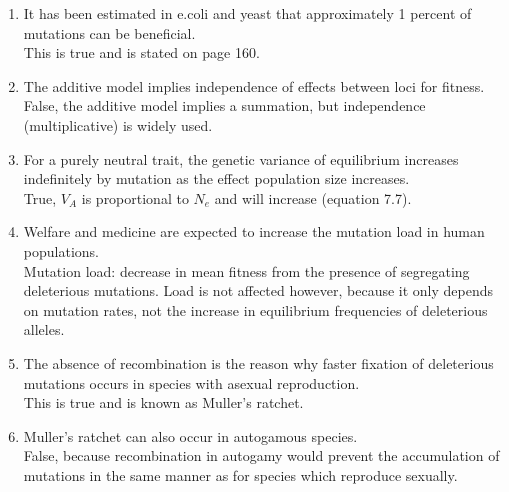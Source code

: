 \documentclass[12pt]{amsart}
\begin{document}
\begin{enumerate}
\item It has been estimated in e.coli and yeast that approximately 1 percent of mutations can be beneficial.\\
This is true and is stated on page 160. \\
\item The additive model implies independence of effects between loci for fitness.\\
False, the additive model implies a summation, but independence (multiplicative) is widely used. \\
\item For a purely neutral trait, the genetic variance of equilibrium increases indefinitely by mutation as the effect population size increases.\\
True, $V_A$ is proportional to $N_e$ and will increase (equation 7.7).\\
\item Welfare and medicine are expected to increase the mutation load in human populations.\\
Mutation load: decrease in mean fitness from the presence of segregating deleterious mutations. Load is not affected however, because it only depends on mutation rates, not the increase in equilibrium frequencies of deleterious alleles.\\
\item The absence of recombination is the reason why faster fixation of deleterious mutations occurs in species with asexual reproduction.\\
This is true and is known as Muller's ratchet.\\
\item Muller's ratchet can also occur in autogamous species.\\
False, because recombination in autogamy would prevent the accumulation of mutations in the same manner as for species which reproduce sexually.
\end{enumerate}


\medskip
\end{document}
